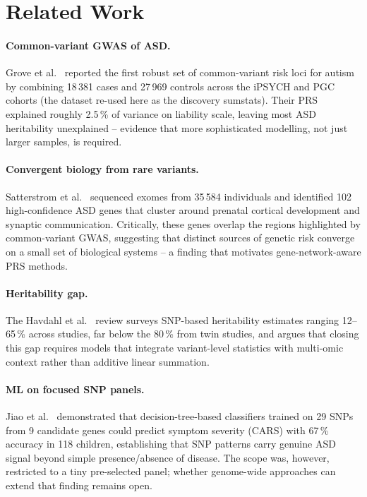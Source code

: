 \section{Related Work}
\label{sec:related}

\paragraph{Common-variant GWAS of ASD.}
Grove et al.~\cite{grove2019} reported the first robust set of common-variant
risk loci for autism by combining 18\,381 cases and 27\,969 controls across
the iPSYCH and PGC cohorts (the dataset re-used here as the discovery
sumstats). Their PRS explained roughly 2.5\,\% of variance on liability
scale, leaving most ASD heritability unexplained -- evidence that more
sophisticated modelling, not just larger samples, is required.

\paragraph{Convergent biology from rare variants.}
Satterstrom et al.~\cite{satterstrom2020} sequenced exomes from 35\,584
individuals and identified 102 high-confidence ASD genes that cluster
around prenatal cortical development and synaptic
communication. Critically, these genes overlap the regions highlighted by
common-variant GWAS, suggesting that distinct sources of genetic risk
converge on a small set of biological systems -- a finding that motivates
gene-network-aware PRS methods.

\paragraph{Heritability gap.}
The Havdahl et al.~\cite{havdahl2021} review surveys SNP-based
heritability estimates ranging 12--65\,\% across studies, far below the
80\,\% from twin studies, and argues that closing this gap requires
models that integrate variant-level statistics with multi-omic context
rather than additive linear summation.

\paragraph{ML on focused SNP panels.}
Jiao et al.~\cite{jiao2012} demonstrated that decision-tree-based
classifiers trained on 29 SNPs from 9 candidate genes could predict
symptom severity (CARS) with 67\,\% accuracy in 118 children, establishing
that SNP patterns carry genuine ASD signal beyond simple presence/absence
of disease. The scope was, however, restricted to a tiny pre-selected
panel; whether genome-wide approaches can extend that finding remains
open.


